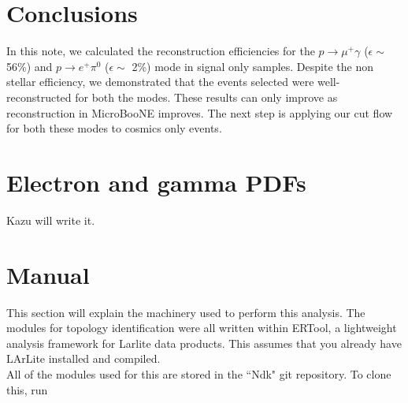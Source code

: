 \documentclass[a4paper, 10pt]{article}
\begin{document}


\section{Conclusions}
In this note, we calculated the reconstruction efficiencies for the $p \rightarrow \mu^{+} \gamma$ ($\epsilon \sim$ 56\%)  and $p \rightarrow e^{+} \pi^{0}$ ($\epsilon \sim$ 2\%)  mode in signal only samples. Despite the non stellar efficiency, we demonstrated that  the events selected were well-reconstructed for both the modes. These results can only improve as reconstruction in MicroBooNE improves. The next step is applying our cut flow for both these modes to cosmics only events.

\nocite{*}




\appendix
\section{Electron and gamma PDFs}
\label{PDFgamma}
Kazu will write it.

\section{Manual}

This section will explain the machinery used to perform this analysis. The modules for topology identification were all written within ERTool, a lightweight analysis framework for Larlite data products. This assumes that you already have LArLite installed and compiled.\\

All of the modules used for this are stored in the ``Ndk" git repository. To clone this, run\\
\end{document}
